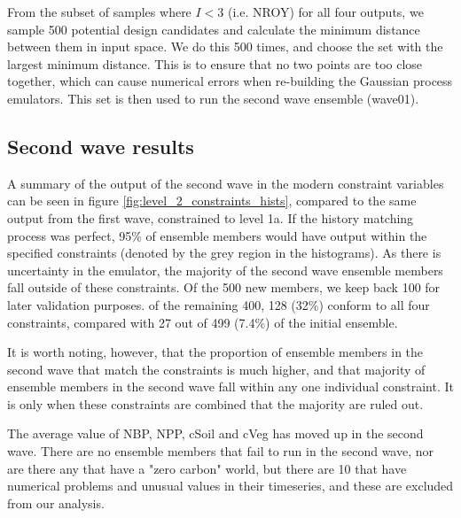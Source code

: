 \documentclass[gmd, manuscript]{copernicus}
\begin{document}

From the subset of samples where $I < 3$ (i.e. NROY) for all four outputs, we sample 500 potential design candidates and calculate the minimum distance between them in input space. We do this 500 times, and choose the set with the largest minimum distance. This is to ensure that no two points are too close together, which can cause numerical errors when re-building the Gaussian process emulators. This set is then used to run the second wave ensemble (wave01).

\subsection{Second wave results}\label{ssec:second_wave_results}

A summary of the output of the second wave in the modern constraint variables can be seen in figure \ref{fig:level_2_constraints_hists}, compared to the same output from the first wave, constrained to level 1a. If the history matching process was perfect, 95\% of ensemble members would have output within the specified constraints (denoted by the grey region in the histograms). As there is uncertainty in the emulator, the majority of the second wave ensemble members fall outside of these constraints. Of the 500 new members, we keep back 100 for later validation purposes. of the remaining 400, 128 (32\%) conform to all four constraints, compared with 27 out of 499 (7.4\%) of the initial ensemble.

It is worth noting, however, that the proportion of ensemble members in the second wave that match the constraints is much higher, and that majority of ensemble members in the second wave fall within any one individual constraint. It is only when these constraints are combined that the majority are ruled out.

The average value of NBP, NPP, cSoil and cVeg has moved up in the second wave. There are no ensemble members that fail to run in the second wave, nor are there any that have a "zero carbon" world, but there are 10 that have numerical problems and unusual values in their timeseries, and these are excluded from our analysis.
\end{document}
